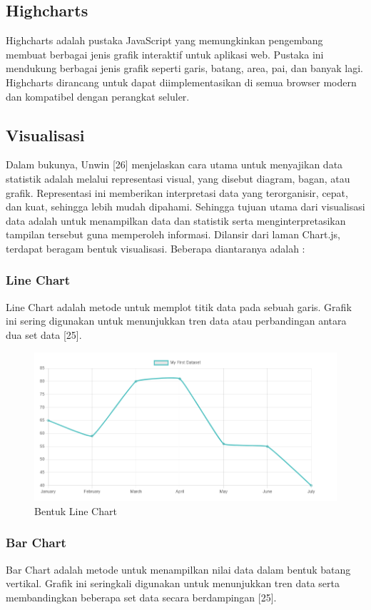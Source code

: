 \subsection{Highcharts}
Highcharts adalah pustaka JavaScript yang memungkinkan pengembang membuat berbagai jenis grafik interaktif untuk aplikasi web. Pustaka ini mendukung berbagai jenis grafik seperti garis, batang, area, pai, dan banyak lagi. Highcharts dirancang untuk dapat diimplementasikan di semua browser modern dan kompatibel dengan perangkat seluler\cite{Highcharts}.

\subsection{Visualisasi}
Dalam bukunya, Unwin [26] menjelaskan cara utama untuk menyajikan data statistik adalah melalui representasi visual, yang disebut diagram, bagan, atau grafik. Representasi ini memberikan interpretasi data yang terorganisir, cepat, dan kuat, sehingga lebih mudah dipahami. Sehingga tujuan utama dari visualisasi data adalah untuk menampilkan data dan statistik serta menginterpretasikan tampilan tersebut guna memperoleh informasi. Dilansir dari laman Chart.js, terdapat beragam bentuk visualisasi. Beberapa diantaranya adalah : 

\subsubsection{Line Chart}
Line Chart adalah metode untuk memplot titik data pada sebuah garis. Grafik ini sering digunakan untuk menunjukkan tren data atau perbandingan antara dua set data [25].

\begin{figure}[H]
	\centering
	\includegraphics[width=0.8\linewidth]{gambar/Dasar teori/LineChart.png}
	\caption{Bentuk Line Chart}
	\label{gambar1}
\end{figure}

\subsubsection{Bar Chart}
Bar Chart adalah metode untuk menampilkan nilai data dalam bentuk batang vertikal. Grafik ini seringkali digunakan untuk menunjukkan tren data serta membandingkan beberapa set data secara berdampingan [25].

